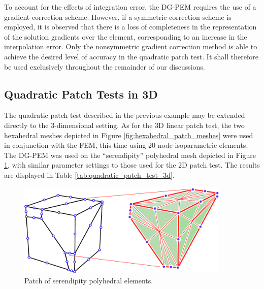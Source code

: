 To account for the effects of integration error, the DG-PEM requires the use of a gradient correction scheme. However, if a symmetric correction scheme is employed, it is observed that there is a loss of completeness in the representation of the solution gradients over the element, corresponding to an increase in the interpolation error. Only the nonsymmetric gradient correction method is able to achieve the desired level of accuracy in the quadratic patch test. It shall therefore be used exclusively throughout the remainder of our discussions.

\subsection*{Quadratic Patch Tests in 3D}

The quadratic patch test described in the previous example may be extended directly to the 3-dimensional setting. As for the 3D linear patch test, the two hexahedral meshes depicted in Figure \ref{fig:hexahedral_patch_meshes} were used in conjunction with the FEM, this time using 20-node isoparametric elements. The DG-PEM was used on the ``serendipity'' polyhedral mesh depicted in Figure \ref{fig:quadratic_polyhedral_patch_mesh}, with similar parameter settings to those used for the 2D patch test. The results are displayed in Table \ref{tab:quadratic_patch_test_3d}.

\begin{figure}[!h]
    \centering
    \includegraphics[width=4.0in]{figures/quadratic_polyhedral_patch_mesh.pdf}
    	\caption{Patch of serendipity polyhedral elements.}
    \label{fig:quadratic_polyhedral_patch_mesh}
\end{figure}

